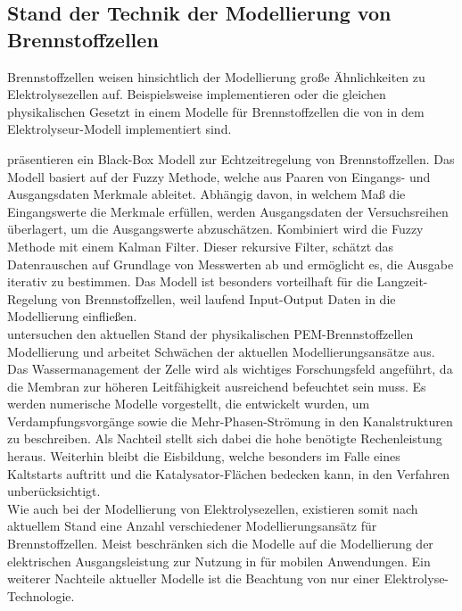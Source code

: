 \subsection{Stand der Technik der Modellierung von Brennstoffzellen}
Brennstoffzellen weisen hinsichtlich der Modellierung große Ähnlichkeiten zu Elektrolysezellen auf. Beispielsweise implementieren \citet{motapon_development_2012} oder \citet{chugh_experimental_2020} die gleichen physikalischen Gesetzt in einem Modelle für Brennstoffzellen die  von \citet{tjarks_pem-elektrolyse-systeme_2017} in dem Elektrolyseur-Modell implementiert sind.

\citet{barragan_iterative_2020} präsentieren ein Black-Box Modell zur Echtzeitregelung von Brennstoffzellen.
Das Modell basiert auf der Fuzzy Methode, welche aus Paaren von Eingangs- und Ausgangsdaten Merkmale ableitet.
Abhängig davon, in welchem Maß die Eingangswerte die Merkmale erfüllen, werden Ausgangsdaten der Versuchsreihen überlagert, um die Ausgangswerte abzuschätzen. 
Kombiniert wird die Fuzzy Methode mit einem Kalman Filter. 
Dieser rekursive Filter, schätzt das Datenrauschen auf Grundlage von Messwerten ab und ermöglicht es, die Ausgabe iterativ zu bestimmen. 
Das Modell ist besonders vorteilhaft für die Langzeit-Regelung von Brennstoffzellen, weil laufend Input-Output Daten in die Modellierung einfließen.\\

\citet{jiao_challenges_2017} untersuchen den aktuellen Stand der physikalischen PEM-Brennstoffzellen Modellierung und arbeitet Schwächen der aktuellen Modellierungsansätze aus. Das Wassermanagement der Zelle wird als wichtiges Forschungsfeld angeführt, da die Membran zur höheren Leitfähigkeit ausreichend befeuchtet sein muss.
Es werden numerische Modelle vorgestellt, die entwickelt wurden, um Verdampfungsvorgänge sowie die Mehr-Phasen-Strömung in den Kanalstrukturen zu beschreiben. Als Nachteil stellt sich dabei die hohe benötigte Rechenleistung heraus.
Weiterhin bleibt die Eisbildung, welche besonders im Falle eines Kaltstarts auftritt und die Katalysator-Flächen bedecken kann, in den Verfahren unberücksichtigt.\\

Wie auch bei der Modellierung von Elektrolysezellen, existieren somit nach aktuellem Stand eine Anzahl verschiedener Modellierungsansätz für Brennstoffzellen. Meist beschränken sich die Modelle auf die Modellierung der elektrischen Ausgangsleistung zur Nutzung in für mobilen Anwendungen. Ein weiterer Nachteile aktueller Modelle ist die Beachtung von nur einer Elektrolyse-Technologie.

